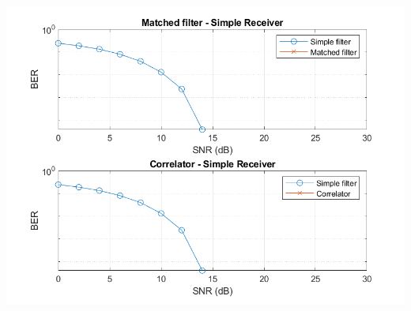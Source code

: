 \documentclass[a4paper, 12pt, english]{article}
\newenvironment{Figure}
  {\par\medskip\noindent\minipage{\linewidth}}
  {\endminipage\par\medskip}
\begin{document}
\begin{Figure}
 \centering
 \includegraphics[width=\linewidth, scale=0.5]{figures/performance-of-matched-filters-and-correlators/BER100samples.png}
\end{Figure}
\end{document}
